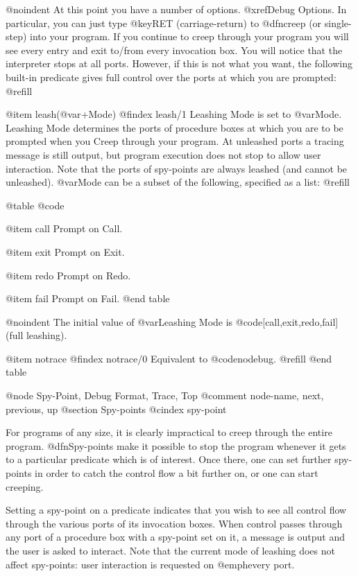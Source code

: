 @noindent
At this point you have a number of options. @xref{Debug Options}.  In
particular, you can just type @key{RET} (carriage-return) to @dfn{creep}
(or single-step) into your program.  If you continue to creep through your
program you will see every entry and exit to/from every invocation box.
You will notice that the interpreter stops at all ports.  However, if this
is not what you want, the following built-in predicate gives full control
over the ports at which you are prompted: @refill

@item leash(@var{+Mode})
@findex leash/1
Leashing Mode is set to @var{Mode}.  Leashing Mode determines the ports
of procedure boxes at which you are to be prompted when you Creep
through your program.  At unleashed ports a tracing message is still
output, but program execution does not stop to allow user interaction.
Note that the ports of spy-points are always leashed (and cannot be
unleashed).  @var{Mode} can be a subset of the following, specified as a
list: @refill

@table @code

@item call
Prompt on Call.

@item exit
Prompt on Exit.

@item redo
Prompt on Redo.

@item fail
Prompt on Fail.
@end table

@noindent
The initial value of @var{Leashing Mode} is @code{[call,exit,redo,fail]}
(full leashing).

@item notrace
@findex notrace/0
Equivalent to @code{nodebug}. @refill
@end table

@node Spy-Point, Debug Format, Trace, Top
@comment  node-name,  next,  previous,  up
@section Spy-points
@cindex spy-point

For programs of any size, it is clearly impractical to creep through the
entire program.  @dfn{Spy-points} make it possible to stop the program
whenever it gets to a particular predicate which is of interest.  Once
there, one can set further spy-points in order to catch the control flow
a bit further on, or one can start creeping.

Setting a spy-point on a predicate indicates that you wish to see all
control flow through the various ports of its invocation boxes.  When
control passes through any port of a procedure box with a spy-point set on
it, a message is output and the user is asked to interact.  Note that
the current mode of leashing does not affect spy-points: user
interaction is requested on @emph{every} port.

